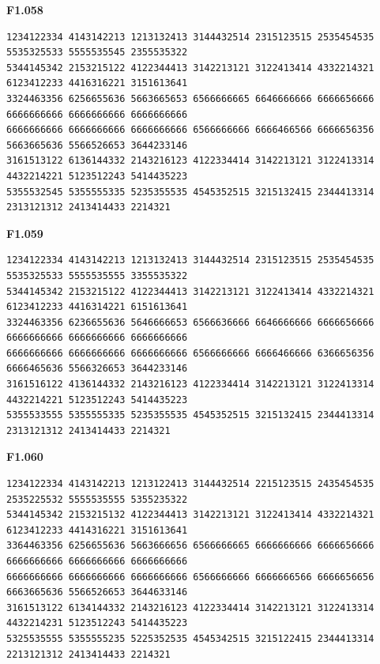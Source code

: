 \noindent\begin{minipage}{\linewidth}\textbf{F1.058}
\begin{lstlisting}
1234122334 4143142213 1213132413 3144432514 2315123515 2535454535 5535325533 5555535545 2355535322
5344145342 2153215122 4122344413 3142213121 3122413414 4332214321 6123412233 4416316221 3151613641
3324463356 6256655636 5663665653 6566666665 6646666666 6666656666 6666666666 6666666666 6666666666
6666666666 6666666666 6666666666 6566666666 6666466566 6666656356 5663665636 5566526653 3644233146
3161513122 6136144332 2143216123 4122334414 3142213121 3122413314 4432214221 5123512243 5414435223
5355532545 5355555335 5235355535 4545352515 3215132415 2344413314 2313121312 2413414433 2214321
\end{lstlisting}
\end{minipage}\par\smallskip

\noindent\begin{minipage}{\linewidth}\textbf{F1.059}
\begin{lstlisting}
1234122334 4143142213 1213132413 3144432514 2315123515 2535454535 5535325533 5555535555 3355535322
5344145342 2153215122 4122344413 3142213121 3122413414 4332214321 6123412233 4416314221 6151613641
3324463356 6236655636 5646666653 6566636666 6646666666 6666656666 6666666666 6666666666 6666666666
6666666666 6666666666 6666666666 6566666666 6666466666 6366656356 6666465636 5566326653 3644233146
3161516122 4136144332 2143216123 4122334414 3142213121 3122413314 4432214221 5123512243 5414435223
5355533555 5355555335 5235355535 4545352515 3215132415 2344413314 2313121312 2413414433 2214321
\end{lstlisting}
\end{minipage}\par\smallskip

\noindent\begin{minipage}{\linewidth}\textbf{F1.060}
\begin{lstlisting}
1234122334 4143142213 1213122413 3144432514 2215123515 2435454535 2535225532 5555535555 5355235322
5344145342 2153215132 4122344413 3142213121 3122413414 4332214321 6123412233 4414316221 3151613641
3364463356 6256655636 5663666656 6566666665 6666666666 6666656666 6666666666 6666666666 6666666666
6666666666 6666666666 6666666666 6566666666 6666666566 6666656656 6663665636 5566526653 3644633146
3161513122 6134144332 2143216123 4122334414 3142213121 3122413314 4432214231 5123512243 5414435223
5325535555 5355555235 5225352535 4545342515 3215122415 2344413314 2213121312 2413414433 2214321
\end{lstlisting}
\end{minipage}\par\smallskip

